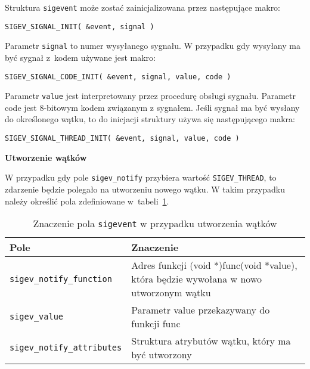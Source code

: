Struktura \lstinline[style=MyCStyle]{sigevent} może zostać zainicjalizowana przez następujące makro:

\begin{lstlisting}[style=MyCStyle]
SIGEV_SIGNAL_INIT( &event, signal )
\end{lstlisting}

Parametr \lstinline[style=MyCStyle]{signal} to numer wysyłanego sygnału. W przypadku gdy wysyłany ma być sygnał z~kodem używane jest makro:

\begin{lstlisting}[style=MyCStyle]
SIGEV_SIGNAL_CODE_INIT( &event, signal, value, code )
\end{lstlisting}

Parametr \lstinline[style=MyCStyle]{value} jest interpretowany przez procedurę obsługi sygnału. Parametr code jest 8-bitowym kodem związanym z sygnałem. Jeśli sygnał ma być wysłany do określonego wątku, to do inicjacji struktury używa się następującego makra:

\begin{lstlisting}[style=MyCStyle]
SIGEV_SIGNAL_THREAD_INIT( &event, signal, value, code )
\end{lstlisting}

\noindent
\textbf{Utworzenie wątków}

W przypadku gdy pole \lstinline[style=MyCStyle]{sigev_notify} przybiera wartość \lstinline[style=MyCStyle]{SIGEV_THREAD}, to zdarzenie będzie polegało na utworzeniu nowego wątku. W takim przypadku należy określić pola zdefiniowane w~tabeli~\ref{tab:sigevent4}.

\begin{table}[h!]
\centering
\caption{Znaczenie pola  \lstinline[style=MyCStyle]{sigevent} w przypadku utworzenia wątków}
\setlength{\arrayrulewidth}{1pt}
\setlength{\tabcolsep}{6pt}
\renewcommand{\arraystretch}{1.2}
\begin{tabular}{ |p{}|p{}|}
\hline \rowcolor{gray}
\textbf{Pole} & \textbf{Znaczenie} \\ \hline
\mbox{\lstinline[style=MyCStyle]{sigev_notify_function}} & Adres funkcji (void *)func(void *value), która będzie wywołana w nowo utworzonym wątku \\ \hline
\mbox{\lstinline[style=MyCStyle]{sigev_value}} & Parametr value przekazywany do funkcji func \\ \hline
\mbox{\lstinline[style=MyCStyle]{sigev_notify_attributes}} & Struktura atrybutów wątku, który ma być utworzony \\ \hline
\end{tabular}
\label{tab:sigevent4}
\end{table}

